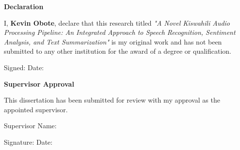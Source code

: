 \thispagestyle{empty}
\begin{center}
    \textbf{\Large Declaration}
\end{center}

\vspace{1cm}

I, \textbf{Kevin Obote}, declare that this research titled \textit{"A Novel Kiswahili Audio Processing Pipeline: An Integrated Approach to Speech Recognition, Sentiment Analysis, and Text Summarization"} is my original work and has not been submitted to any other institution for the award of a degree or qualification.

\vspace{1cm}

\noindent
Signed: \hrulefill \hfill Date: \hrulefill

\vspace{2cm}

\begin{center}
    \textbf{\Large Supervisor Approval}
\end{center}

\vspace{1cm}

This dissertation has been submitted for review with my approval as the appointed supervisor.

\vspace{1cm}

\noindent
Supervisor Name: \hrulefill

\vspace{0.5cm}
\noindent
Signature: \hrulefill \hfill Date: \hrulefill
